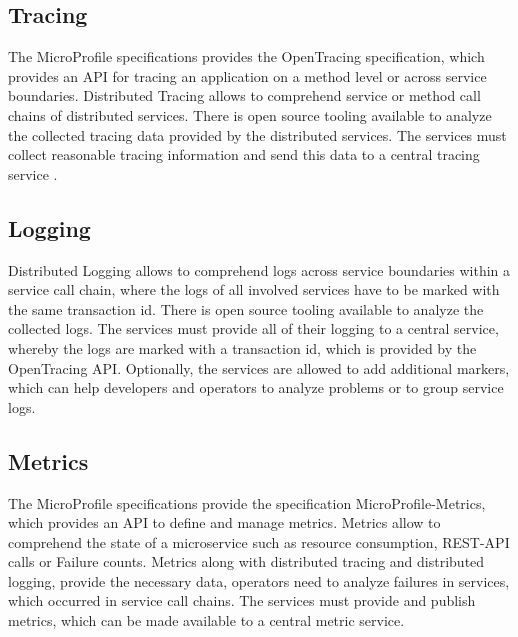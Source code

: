 \subsection{Tracing}
\label{sec:esboc-aspects-tracing}
The MicroProfile specifications provides the OpenTracing specification, which provides an API for tracing an application on a method level or across service boundaries. Distributed Tracing allows to comprehend service or method call chains of distributed services. There is open source tooling available to analyze the collected tracing data provided by the distributed services. The services must collect reasonable tracing information and send this data to a central tracing service \cite{CNCFOpentracing2018}.

\subsection{Logging}
\label{sec:esboc-aspects-logging}
Distributed Logging allows to comprehend logs across service boundaries within a service call chain, where the logs of all involved services have to be marked with the same transaction id. There is open source tooling available to analyze the collected logs. The services must provide all of their logging to a central service, whereby the logs are marked with a transaction id, which is provided by the OpenTracing API. Optionally, the services are allowed to add additional markers, which can help developers and operators to analyze problems or to group service logs.

\subsection{Metrics}
\label{sec:esboc-aspects-metrics}
The MicroProfile specifications provide the specification MicroProfile-Metrics, which provides an API to define and manage metrics. Metrics allow to comprehend the state of a microservice such as resource consumption, REST-API calls or Failure counts. Metrics along with distributed tracing and distributed logging, provide the necessary data, operators need to analyze failures in services, which occurred in service call chains. The services must provide and publish metrics, which can be made available to a central metric service.

